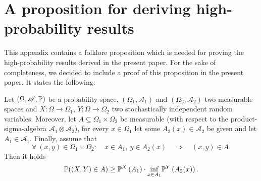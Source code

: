 

\section{A proposition for deriving high-probability results}
This appendix contains a folklore proposition which is needed for proving the high-probability results derived in the present paper. For the sake of completeness, we decided to include a proof of this proposition in the present paper. It states the following:
\begin{proposition} \label{prop:highprob}
Let $(\Omega, \mathscr{A}, \mathbb{P})$ be a probability space, $(\Omega_1, \mathscr{A}_1)$ and $(\Omega_2, \mathscr{A}_2)$ two measurable spaces and $X: \Omega \to \Omega_1$, $Y: \Omega \to \Omega_2$ two stochastically independent random variables. Moreover, let $A \subseteq \Omega_1 \times \Omega_2$ be measurable (with respect to the product-sigma-algebra $\mathscr{A}_1 \otimes \mathscr{A}_2$), for every $x \in \Omega_1$ let some $A_2(x) \in \mathscr{A}_2$ be given and let $A_1 \in \mathscr{A}_1$. Finally, assume that 
\begin{equation} \label{eq:implic}
\forall \ (x,y) \in \Omega_1 \times \Omega_2: \quad x \in A_1, \ y \in A_2(x) \quad \Longrightarrow \quad (x,y) \in A.
\end{equation}
Then it holds
\begin{equation*}
\mathbb{P}((X,Y) \in A) \geq \mathbb{P}^{X} \left(A_1\right)\cdot \underset{x \in A_1}{\inf} \mathbb{P}^{Y} \left(A_2(x)\right).
\end{equation*}
\end{proposition}

